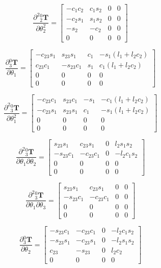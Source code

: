 \documentclass{homework}
\begin{document}
\begin{sol}
\[
  \frac{\partial^2 {_2^0}\mathbf{T}}{\partial \theta_2^2} =
  \begin{bmatrix} 
    -c_{1} c_{2} & c_{1} s_{2} & 0 & 0 \\ 
    -c_{2} s_{1} & s_{1} s_{2} & 0 & 0 \\ 
    -s_{2} & -c_{2} & 0 & 0 \\ 
    0 & 0 & 0 & 0
  \end{bmatrix}
\]

\[
  \frac{\partial {_3^0}\mathbf{T}}{\partial \theta_1} =
  \begin{bmatrix} 
    -c_{23} s_{1} & s_{23} s_{1} & c_{1} & -s_{1} (l_{1} + l_{2} c_{2}) \\ 
    c_{23} c_{1} & -s_{23} c_{1} & s_{1} & c_{1} (l_{1} + l_{2} c_{2}) \\ 
    0 & 0 & 0 & 0 \\ 
    0 & 0 & 0 & 0
  \end{bmatrix}
\]

\[
  \frac{\partial^2 {_3^0}\mathbf{T}}{\partial \theta_1^2} =
  \begin{bmatrix} 
    -c_{23} c_{1} & s_{23} c_{1} & -s_{1} & -c_{1} (l_{1} + l_{2} c_{2}) \\ 
    -c_{23} s_{1} & s_{23} s_{1} & c_{1} & -s_{1} (l_{1} + l_{2} c_{2}) \\ 
    0 & 0 & 0 & 0 \\ 
    0 & 0 & 0 & 0
  \end{bmatrix}
\]

\[
  \frac{\partial^2 {_3^0}\mathbf{T}}{\partial \theta_1 \partial \theta_2} =
  \begin{bmatrix} 
    s_{23} s_{1} & c_{23} s_{1} & 0 & l_{2} s_{1} s_{2} \\ 
    -s_{23} c_{1} & -c_{23} c_{1} & 0 & -l_{2} c_{1} s_{2} \\ 
    0 & 0 & 0 & 0 \\ 
    0 & 0 & 0 & 0
  \end{bmatrix}
\]

\[
  \frac{\partial^2 {_3^0}\mathbf{T}}{\partial \theta_1 \partial \theta_3} =
  \begin{bmatrix} 
    s_{23} s_{1} & c_{23} s_{1} & 0 & 0 \\ 
    -s_{23} c_{1} & -c_{23} c_{1} & 0 & 0 \\ 
    0 & 0 & 0 & 0 \\ 
    0 & 0 & 0 & 0
  \end{bmatrix}
\]

\[
  \frac{\partial {_3^0}\mathbf{T}}{\partial \theta_2} =
  \begin{bmatrix} 
    -s_{23} c_{1} & -c_{23} c_{1} & 0 & - l_{2} c_{1} s_{2} \\ 
    -s_{23} s_{1} & -c_{23} s_{1} & 0 & - l_{2} s_{1} s_{2} \\ 
    c_{23} & -s_{23} & 0 & l_{2} c_{2} \\ 
    0 & 0 & 0 & 0
  \end{bmatrix}
\]


\end{sol}
\end{document}
